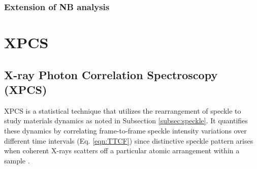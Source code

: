 \documentclass[11pt]{article}
\theoremstyle{definition}
\begin{document}
\subsubsection{Extension of NB analysis}

\section{XPCS}
\label{sec:XPCS}
\subsection{X-ray Photon Correlation Spectroscopy (XPCS)}
\label{subsec:xpcs}
XPCS is a statistical technique that utilizes the rearrangement of speckle to study materials dynamics as noted in Subsection \ref{subsec:speckle}. It quantifies these dynamics by correlating frame-to-frame speckle intensity variations over different time intervals (Eq. \ref{eqn:TTCF}) since distinctive speckle pattern arises when coherent X-rays scatters off a particular atomic arrangement within a sample \cite{jo_single_2023}. 
\end{document}
